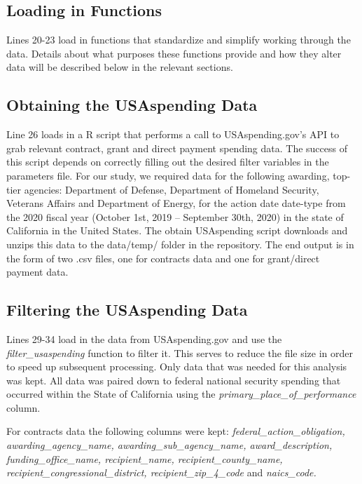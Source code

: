 \documentclass[
]{book}
\begin{document}
\hypertarget{load-functions}{%
\subsection{Loading in Functions}\label{load-functions}}

Lines 20-23 load in functions that standardize and simplify working through the data. Details about what purposes these functions provide and how they alter data will be described below in the relevant sections.

\hypertarget{obtain-data}{%
\subsection{Obtaining the USAspending Data}\label{obtain-data}}

Line 26 loads in a R script that performs a call to USAspending.gov's API to grab relevant contract, grant and direct payment spending data. The success of this script depends on correctly filling out the desired filter variables in the parameters file. For our study, we required data for the following awarding, top-tier agencies: Department of Defense, Department of Homeland Security, Veterans Affairs and Department of Energy, for the action date date-type from the 2020 fiscal year (October 1st, 2019 -- September 30th, 2020) in the state of California in the United States. The obtain USAspending script downloads and unzips this data to the data/temp/ folder in the repository. The end output is in the form of two .csv files, one for contracts data and one for grant/direct payment data.

\hypertarget{filter-data}{%
\subsection{Filtering the USAspending Data}\label{filter-data}}

Lines 29-34 load in the data from USAspending.gov and use the \emph{filter\_usaspending} function to filter it. This serves to reduce the file size in order to speed up subsequent processing. Only data that was needed for this analysis was kept. All data was paired down to federal national security spending that occurred within the State of California using the \emph{primary\_place\_of\_performance} column.

For contracts data the following columns were kept: \emph{federal\_action\_obligation, awarding\_agency\_name, awarding\_sub\_agency\_name, award\_description, funding\_office\_name, recipient\_name, recipient\_county\_name, recipient\_congressional\_district, recipient\_zip\_4\_code} and \emph{naics\_code.}
\end{document}
